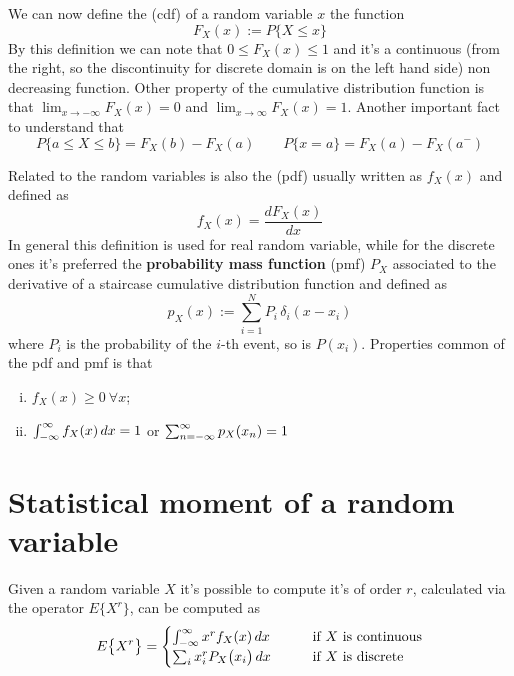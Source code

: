 	We can now define the  (cdf) of a random variable $x$ the function
	\begin{equation}
		F_X(x) := P\big\{ X \leq x \big\}
	\end{equation}
	By this definition we can note that $0 \leq F_X(x) \leq 1$ and it's a continuous (from the right, so the discontinuity for discrete domain is on the left hand side) non decreasing function. Other property of the cumulative distribution function is that $\lim_{x\rightarrow-\infty} F_X(x) = 0$ and $\lim_{x\rightarrow\infty} F_X(x) = 1$. Another important fact to understand that
	\[ P\big\{a\leq X \leq b\big\} = F_X(b) - F_X(a) \qquad P\big\{x=a\big\} = F_X(a) - F_X(a^-) \]
	
	Related to the random variables is also the  (pdf) usually written as $f_X(x)$ and defined as
	\begin{equation}
		f_X(x) = \frac{d F_X(x)}{dx}
	\end{equation} 
	In general this definition is used for real random variable, while for the discrete ones it's preferred the \textbf{probability mass function} (pmf) $P_X$ associated to the derivative of a staircase cumulative distribution function and defined as
	\[ p_X(x) := \sum_{i=1}^N P_i \, \delta_i(x-x_i) \]
	where $P_i$ is the probability of the $i$-th event, so is $P(x_i)$. Properties common of the pdf and pmf is that
	\begin{enumerate}[i)]
		\item $f_X(x) \geq 0 \ \forall x$;
		\item $\int_{-\infty}^\infty f_X(x)\, dx = 1$ or $\sum_{n=-\infty}^\infty p_X(x_n) = 1$
	\end{enumerate}

\section{Statistical moment of a random variable}
	Given a random variable $X$ it's possible to compute it's  of order $r$, calculated via the  operator $E\big\{X^r\big\}$, can be computed as
	\begin{equation}
		E\big\{X^r\big\} = \begin{cases}
			\int_{-\infty}^\infty x^r f_X(x)\, dx \qquad & \textrm{if $X$ is continuous} \\ 		
			\sum_{i}^{} x^r_i P_X\big(x_i\big)\, dx \qquad & \textrm{if $X$ is discrete} 		
		\end{cases}
	\end{equation}

